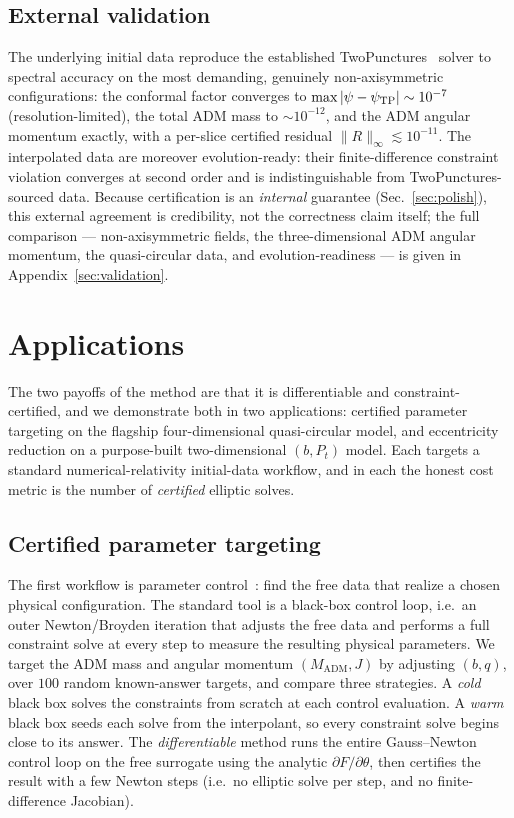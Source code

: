 \documentclass[
  aps,
  prd,
  twocolumn,
  amsmath,
  amssymb,
  nofootinbib,
  superscriptaddress,
  floatfix,
]{revtex4-2}
\newcommand{\Madm}{M_{\mathrm{ADM}}}
\begin{document}
\subsection{External validation}
\label{sec:model:validation}
The underlying initial data reproduce the established
TwoPunctures~\cite{AnsorgBruegmannTichy2004} solver to spectral accuracy on the
most demanding, genuinely non-axisymmetric configurations: the conformal factor
converges to $\max|\psi-\psi_{\rm TP}|\sim10^{-7}$ (resolution-limited), the total
ADM mass to $\sim\!10^{-12}$, and the ADM angular momentum exactly, with a
per-slice certified residual $\|R\|_\infty\lesssim10^{-11}$. The interpolated data
are moreover evolution-ready: their finite-difference constraint violation
converges at second order and is indistinguishable from TwoPunctures-sourced data.
Because certification is an \emph{internal} guarantee (Sec.~\ref{sec:polish}),
this external agreement is credibility, not the correctness claim itself; the full
comparison --- non-axisymmetric fields, the three-dimensional ADM angular
momentum, the quasi-circular data, and evolution-readiness --- is given in
Appendix~\ref{sec:validation}.

\section{Applications}
\label{sec:applications}
The two payoffs of the method are that it is differentiable and
constraint-certified, and we
demonstrate both in two applications: certified parameter targeting on the
flagship four-dimensional quasi-circular model, and eccentricity reduction on a
purpose-built two-dimensional $(b,P_t)$ model. Each targets
a standard numerical-relativity initial-data workflow, and in each the honest cost
metric is the number of \emph{certified} elliptic solves.

\subsection{Certified parameter targeting}
\label{sec:applications:targeting}

The first workflow is parameter control~\cite{Mendes2025}: find the free data that
realize a chosen physical configuration. The standard tool is a black-box control
loop, i.e.\ an outer Newton/Broyden iteration that adjusts the free data and performs a
full constraint solve at every step to measure the resulting physical parameters. We
target the ADM mass and angular momentum $(\Madm,J)$ by adjusting $(b,q)$, over $100$
random known-answer targets, and compare three strategies. A \emph{cold} black box
solves the constraints from scratch at each control evaluation. A \emph{warm} black
box seeds each solve from the interpolant, so every constraint solve begins close to
its answer. The \emph{differentiable} method runs the entire Gauss--Newton control
loop on the free surrogate using the analytic $\partial F/\partial\theta$, then certifies the
result with a few Newton steps (i.e.\ no
elliptic solve per step, and no finite-difference Jacobian).
\end{document}
